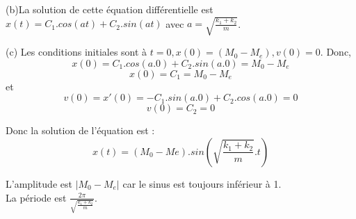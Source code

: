 \documentclass[]{book}
\theoremstyle{definition}
\begin{document}
(b)La solution de cette \'equation diff\'erentielle est $x(t) = C_1.cos(at) + C_2.sin(at)$ avec $a = \sqrt{\frac{k_1+k_2}{m}}$.


(c) Les conditions initiales sont \`a $t=0, x(0) = (M_0-M_e), v(0) = 0$. Donc,
$$x(0) = C_1.cos(a.0) + C_2.sin(a.0) = M_0-M_e$$
$$x(0) = C_1 = M_0-M_e$$
et
$$v(0) = x'(0) = -C_1.sin(a.0) +C_2.cos(a.0) = 0$$
$$v(0) = C_2 = 0$$

Donc la solution de l'\'equation est :
$$x(t) = (M_0-Me).sin(\sqrt{\frac{k_1+k_2}{m}}.t)$$

L'amplitude est $|M_0-M_e|$ car le sinus est toujours inf\'erieur \`a 1. \\
La p\'eriode est $\frac{2\pi}{\sqrt{\frac{k_1+k_2}{m}}}$.
\end{document}
